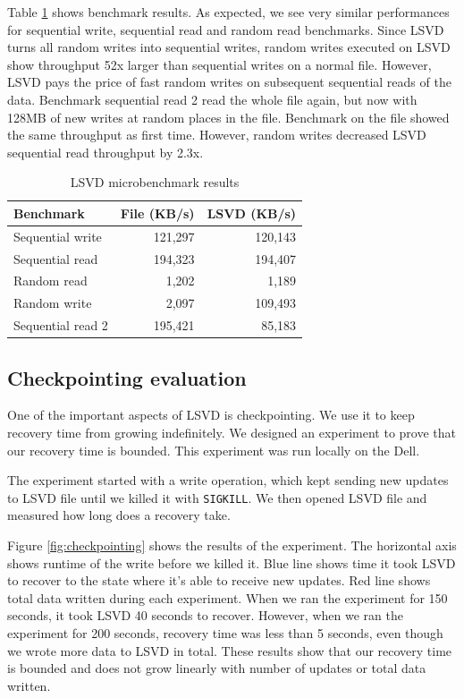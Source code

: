 Table \ref{tab:lsvd} shows benchmark results. As expected, we see very similar performances for sequential write, sequential read and random read benchmarks. Since LSVD turns all random writes into sequential writes, random writes executed on LSVD show throughput 52x larger than sequential writes on a normal file. However, LSVD pays the price of fast random writes on subsequent sequential reads of the data. Benchmark sequential read 2 read the whole file again, but now with 128MB of new writes at random places in the file. Benchmark on the file showed the same throughput as first time. However, random writes decreased LSVD sequential read throughput by 2.3x.


\begin{table}
\centering
\caption{LSVD microbenchmark results}
\label{tab:lsvd}
\begin{tabular}{ | l | r | r | }
\hline
\textbf{Benchmark} & \textbf{File (KB/s)} & \textbf{LSVD (KB/s)} \\
\hline
Sequential write & 121,297 & 120,143 \\
\hline
Sequential read & 194,323 & 194,407 \\
\hline
Random read & 1,202 & 1,189 \\
\hline
Random write & 2,097 & 109,493 \\
\hline
Sequential read 2 & 195,421 & 85,183 \\
\hline
\end{tabular}
\end{table}

\subsection{Checkpointing evaluation}
One of the important aspects of LSVD is checkpointing. We use it to keep recovery time from growing indefinitely. We designed an experiment to prove that our recovery time is bounded. This experiment was run locally on the Dell.

The experiment started with a write operation, which kept sending new updates to LSVD file until we killed it with \texttt{SIGKILL}. We then opened LSVD file and measured how long does a recovery take.

Figure \ref{fig:checkpointing} shows the results of the experiment. The horizontal axis shows runtime of the write before we killed it. Blue line shows time it took LSVD to recover to the state where it's able to receive new updates. Red line shows total data written during each experiment. When we ran the experiment for 150 seconds, it took LSVD 40 seconds to recover. However, when we ran the experiment for 200 seconds, recovery time was less than 5 seconds, even though we wrote more data to LSVD in total. These results show that our recovery time is bounded and does not grow linearly with number of updates or total data written. 


